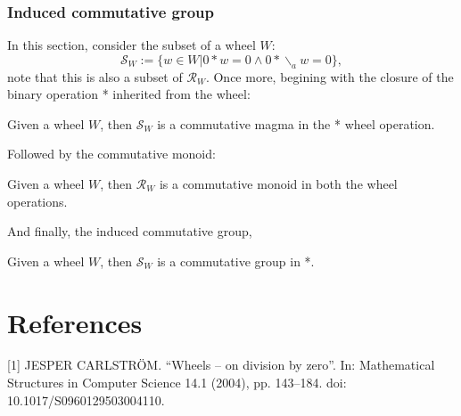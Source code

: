 \subsection{Induced commutative group}
In this section, consider the subset of a wheel $W$:
\[
  \mathcal{S}_{W} := \{ w \in W | 0*w = 0 \wedge 0*\backslash_{a}w = 0 \},
\]
note that this is also a subset of $\mathcal{R}_{W}$. Once more, begining with the closure of the binary operation *
inherited from the wheel:
\begin{definition}
  \leanok
  Given a wheel $W$, then $\mathcal{S}_{W}$ is a commutative magma in the * wheel operation.
\end{definition}
Followed by the commutative monoid:
\begin{definition}
  \leanok
  Given a wheel $W$, then $\mathcal{R}_{W}$ is a commutative monoid in both the wheel operations.
\end{definition}
And finally, the induced commutative group,
\begin{definition}
  \leanok
  Given a wheel $W$, then $\mathcal{S}_{W}$ is a commutative group in *.
\end{definition}
\chapter{References}
[1] JESPER CARLSTRÖM. “Wheels – on division by zero”. In: Mathematical Structures in Computer Science 14.1 (2004), pp. 143–184. doi: 10.1017/S0960129503004110.
